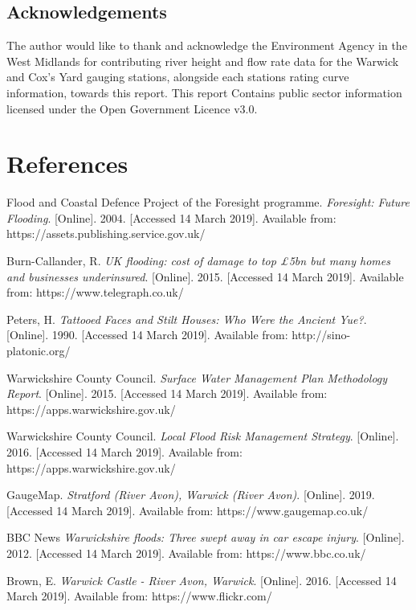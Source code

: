 \documentclass[11pt,a4paper]{article}
\begin{document}
\subsection{Acknowledgements}
The author would like to thank and acknowledge the Environment Agency in the West Midlands for contributing river height and flow rate data for the Warwick and Cox's Yard gauging stations, alongside each stations rating curve information, towards this report. This report Contains public sector information licensed under the Open Government Licence v3.0.

\newpage
\section{References}
\begin{thebibliography}{}
Flood and Coastal Defence Project of the Foresight programme. \textit{Foresight: Future Flooding}. [Online]. 2004. [Accessed 14 March 2019]. Available from: https://assets.publishing.service.gov.uk/

Burn-Callander, R. \textit{UK flooding: cost of damage to top £5bn but many homes and businesses underinsured}. [Online]. 2015. [Accessed 14 March 2019]. Available from: https://www.telegraph.co.uk/

Peters, H. \textit{Tattooed Faces and Stilt Houses: Who Were the Ancient Yue?}. [Online]. 1990. [Accessed 14 March 2019]. Available from: http://sino-platonic.org/

Warwickshire County Council. \textit{Surface Water Management Plan Methodology Report}. [Online]. 2015. [Accessed 14 March 2019]. Available from: https://apps.warwickshire.gov.uk/

Warwickshire County Council. \textit{Local Flood Risk Management Strategy}. [Online]. 2016. [Accessed 14 March 2019]. Available from: https://apps.warwickshire.gov.uk/

\bibitem{}
GaugeMap. \textit{Stratford (River Avon), Warwick (River Avon)}. [Online]. 2019. [Accessed 14 March 2019]. Available from: https://www.gaugemap.co.uk/

\bibitem{}
BBC News \textit{Warwickshire floods: Three swept away in car escape injury}. [Online]. 2012. [Accessed 14 March 2019]. Available from: https://www.bbc.co.uk/

Brown, E. \textit{Warwick Castle - River Avon, Warwick}. [Online]. 2016. [Accessed 14 March 2019]. Available from: https://www.flickr.com/


\end{thebibliography}
\end{document}
